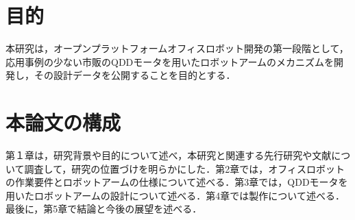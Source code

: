 
\section{目的}
本研究は，オープンプラットフォームオフィスロボット開発の第一段階として，応用事例の少ない市販のQDDモータを用いたロボットアームのメカニズムを開発し，その設計データを公開することを目的とする．
\section{本論文の構成}
第１章は，研究背景や目的について述べ，本研究と関連する先行研究や文献について調査して，研究の位置づけを明らかにした．第2章では，オフィスロボットの作業要件とロボットアームの仕様について述べる．第3章では，QDDモータを用いたロボットアームの設計について述べる．第4章では製作について述べる．最後に，第5章で結論と今後の展望を述べる．

\newpage